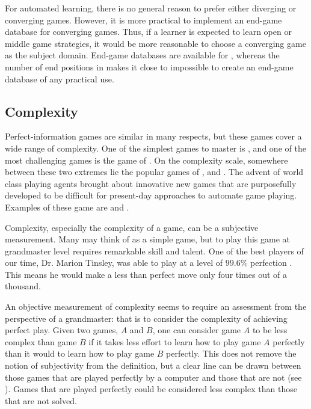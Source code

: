 For automated learning, there is no general reason to prefer either diverging or converging games.  However, it is more practical to implement an end-game database for converging games. Thus, if a learner is expected to learn open or middle game strategies, it would be more reasonable to choose a converging game as the subject domain.  End-game databases are available for , whereas the number of end positions in  makes it close to impossible to create an end-game database of any practical use.  

\subsection{Complexity}
\label{sec:games:complexity}
Perfect-information games are similar in many respects, but these games cover a wide range of complexity.  One of the simplest games to master is , and one of the most challenging games is the game of .   On the complexity scale, somewhere between these two extremes lie the popular games of ,  and .  The advent of world class playing agents brought about innovative new games that are purposefully developed to be difficult for present-day approaches to automate game playing.  Examples of these game are  and .  

Complexity, especially the complexity of a game, can be a subjective measurement. Many may think of  as a simple game, but to play this game at grandmaster level requires remarkable skill and talent.  One of the best players of our time, Dr. Marion Tinsley, was able to play at a level of $99.6\%$ perfection \cite{schaeffer:reexamination}.  This means he would make a less than perfect move only four times out of a thousand.  

An objective measurement of complexity seems to require an assessment from the perspective of a grandmaster:  that is to consider the complexity of achieving perfect play.  Given two games, $A$ and $B$, one can consider game $A$ to be less complex than game $B$ if it takes less effort to learn how to play game $A$ perfectly than it would to learn how to play game $B$ perfectly. This does not remove the notion of subjectivity from the definition, but a clear line can be drawn between those games that are played perfectly by a computer and those that are not (see ).  Games that are played perfectly could be considered less complex than those that are not solved.


